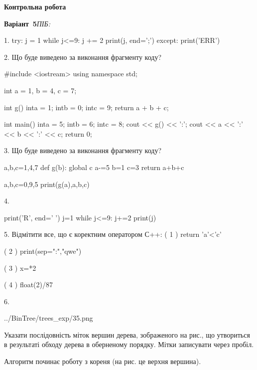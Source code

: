 \documentclass[11pt]{article}
\begin{document}
{\large\textbf{Контрольна робота}}

\textbf{Варіант \No\,5}\hfill \textit{ПІБ:}\,\underline{\hspace{60mm}}
\vspace{4mm}

1. 
try:
    j = 1
    while j<=9:
        j += 2
    print(j, end=';')
except:
    print('ERR')
\vspace{5mm}

2. Що буде виведено за виконання фрагменту коду?

#include <iostream>
using namespace std;

int a = 1, b = 4, c = 7;

int g(){
    inta = 1;
    intb = 0;
    intc = 9;
    return a + b + c;
}

int main(){
    inta = 5;
    intb = 6;
    intc = 8;
    cout << g() << ':';
    cout << a << ':' << b << ':' << c;
    return 0;
}
\vspace{5mm}

3. Що буде виведено за виконання фрагменту коду?

a,b,c=1,4,7
def g(b):
global c    a-=5
    b=1
    c=3
    return a+b+c

a,b,c=0,9,5
print(g(a),a,b,c)
\vspace{5mm}

4. 

print('R', end=' ')
j=1
while j<=9:
    j+=2
print(j)

\vspace{5mm}

5. %
Відмітити все, що є коректним оператором С++:
( 1 ) return 'a'<'c'

( 2 ) print(sep=":","qwe")

( 3 ) x=*2

( 4 ) float(2)/87
\vspace{5mm}

6. 

\begin{center}
	{../BinTree/trees_exp/35.png}
\end{center}
Указати послідовність міток вершин дерева, зображеного на рис., що утвориться в результаті обходу дерева в оберненому порядку. Мітки записувати через пробіл.\par Алгоритм починає роботу з кореня (на рис. це верхня вершина).
\vspace{5mm}
\end{document}
